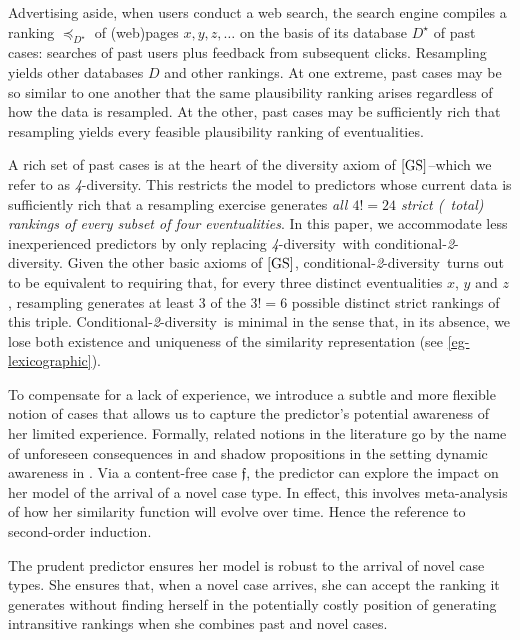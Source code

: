 \documentclass[12pt,a4paper,twoside]{article}
\newcommand{\gsii}{$\textup{[GS]}$}
\newcommand{\novel}{\mathfrak f}
\newcommand{\preceqb}{\mathbin{\preceq}}
\newcommand{\condtwodiv}{\textup{conditional-\textit{2}-diversity}}
\newcommand{\Condtwodiv}{\textup{Conditional-\textit{2}-diversity}}
\newcommand{\fourdiv}{\textit{4}-\textup{diversity}}
\begin{document}
\begin{example}\label{eg-search_engine}
  Advertising aside, when users conduct a web search, the search engine compiles
  a ranking $\preceqb_{D^{\star}}$ of (web)pages $x, y, z, \dots$ on the basis
  of its database $D^{\star }$ of past cases: searches of past users plus
  feedback from subsequent clicks.  Resampling yields other databases $D$ and
  other rankings.  At one extreme, past cases may be so similar to one another
  that the same plausibility ranking arises regardless of how the data is
  resampled.  At the other, past cases may be sufficiently rich that resampling
  yields every feasible plausibility ranking of eventualities.
\end{example}

A rich set of past cases is at the heart of the diversity axiom of \gsii--which
we refer to as \fourdiv. This restricts the model to predictors whose current
data is sufficiently rich that a resampling exercise generates \emph{all
  $4!=24 $ strict (\ie\ total) rankings of every subset of four
  eventualities}. In this paper, we accommodate less inexperienced predictors by
only replacing \fourdiv\ with \condtwodiv. Given the other basic axioms of
\gsii, \condtwodiv\ turns out to be equivalent to requiring that, for every
three distinct eventualities $x$, $y$ and $z$, resampling generates at least $3$
of the $3! = 6$ possible distinct strict rankings of this triple. \Condtwodiv\
is minimal in the sense that, in its absence, we lose both existence and
uniqueness of the similarity representation (see \cref{eg-lexicographic}).  

To compensate for a lack of experience, we introduce a subtle and more flexible
notion of cases that allows us to capture the predictor's potential awareness of
her limited experience.  Formally, related notions in the literature go by the
name of unforeseen consequences in \citet{GQ-Surprises} and shadow propositions
in the setting dynamic awareness in \citet{HP-Dynamic_awareness}. Via a
content-free case $\novel $, the predictor can explore the impact on her model
of the arrival of a novel case type. In effect, this involves meta-analysis of
how her similarity function will evolve over time. Hence the reference to
second-order induction.

The prudent predictor  ensures her model is robust to the arrival of novel case
types. She ensures that, when a novel case arrives, she can accept the ranking
it generates without finding herself in the potentially costly position of
generating intransitive rankings when she combines past and novel cases.
\end{document}
